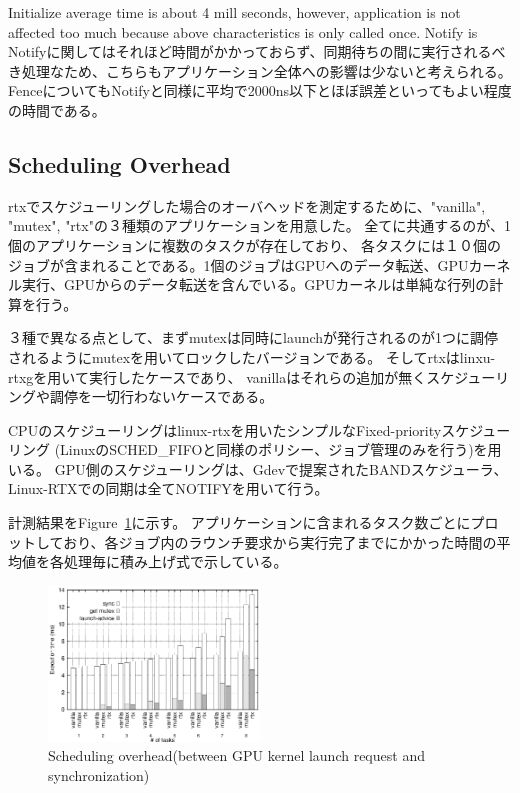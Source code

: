 Initialize average time is about 4 mill seconds, however, application is not affected too much because above characteristics is only called once.
Notify is 
Notifyに関してはそれほど時間がかかっておらず、同期待ちの間に実行されるべき処理なため、こちらもアプリケーション全体への影響は少ないと考えられる。
FenceについてもNotifyと同様に平均で2000ns以下とほぼ誤差といってもよい程度の時間である。

\subsection{Scheduling Overhead}\label{sec:eval:sched_overhead}

rtxでスケジューリングした場合のオーバヘッドを測定するために、"vanilla", "mutex", "rtx"の３種類のアプリケーションを用意した。
全てに共通するのが、1個のアプリケーションに複数のタスクが存在しており、
各タスクには１０個のジョブが含まれることである。1個のジョブはGPUへのデータ転送、GPUカーネル実行、GPUからのデータ転送を含んでいる。GPUカーネルは単純な行列の計算を行う。

３種で異なる点として、まずmutexは同時にlaunchが発行されるのが1つに調停されるようにmutexを用いてロックしたバージョンである。
そしてrtxはlinxu-rtxgを用いて実行したケースであり、
vanillaはそれらの追加が無くスケジューリングや調停を一切行わないケースである。

CPUのスケジューリングはlinux-rtxを用いたシンプルなFixed-priorityスケジューリング (LinuxのSCHED\_FIFOと同様のポリシー、ジョブ管理のみを行う)を用いる。
GPU側のスケジューリングは、Gdevで提案されたBANDスケジューラ、Linux-RTXでの同期は全てNOTIFYを用いて行う。

計測結果をFigure~\ref{fig:fp_overhead}に示す。
アプリケーションに含まれるタスク数ごとにプロットしており、各ジョブ内のラウンチ要求から実行完了までにかかった時間の平均値を各処理毎に積み上げ式で示している。


\begin{figure}[t]
\begin{center}
\includegraphics[width=0.5\textwidth]{img/sum_task_fp.eps}
\caption{Scheduling overhead(between GPU kernel launch request and synchronization)}
\end{center}
\label{fig:fp_overhead}
\end{figure}

